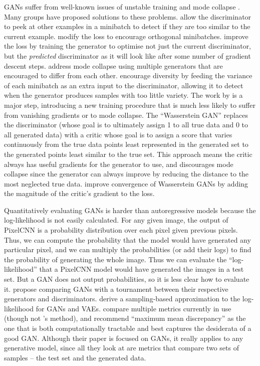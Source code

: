 \documentclass[11pt, a4paper]{book}
\newcommand{\nquote}[1]{``{#1}''}
\begin{document}
GANs suffer from well-known issues of unstable training and mode collapse \citep{gantechniques}. Many groups have proposed solutions to these problems. \citet{gantechniques} allow the discriminator to peek at other examples in a minibatch to detect if they are too similar to the current example. \citet{energygan} modify the loss to encourage orthogonal minibatches. \citet{unrolledgan} improve the loss by training the generator to optimise not just the current discriminator, but the \emph{predicted} discriminator as it will look like after some number of gradient descent steps. \citet{multiagentgan} address mode collapse using multiple generators that are encouraged to differ from each other. \citet{progressivegrowing} encourage diversity by feeding the variance of each minibatch as an extra input to the discriminator, allowing it to detect when the generator produces samples with too little variety. The work by \citet{wgan} is a major step, introducing a new training procedure that is much less likely to suffer from vanishing gradients or to mode collapse. The \nquote{Wasserstein GAN} replaces the discriminator (whose goal is to ultimately assign 1 to all true data and 0 to all generated data) with a critic whose goal is to assign a score that varies continuously from the true data points least represented in the generated set to the generated points least similar to the true set. This approach means the critic always has useful gradients for the generator to use, and discourages mode collapse since the generator can always improve by reducing the distance to the most neglected true data. \citet{improvedwgans} improve convergence of Wasserstein GANs by adding the magnitude of the critic's gradient to the loss.

Quantitatively evaluating GANs is harder than autoregressive models because the log-likelihood is not easily calculated. For any given image, the output of PixelCNN is a probability distribution over each pixel given previous pixels. Thus, we can compute the probability that the model would have generated any particular pixel, and we can multiply the probabilities (or add their logs) to find the probability of generating the whole image. Thus we can evaluate the \nquote{log-likelihood} that a PixelCNN model would have generated the images in a test set. But a GAN does not output probabilities, so it is less clear how to evaluate it. \citet{gantournament} propose comparing GANs with a tournament between their respective generators and discriminators. \citet{likelihoodestimation} derive a sampling-based approximation to the log-likelihood for GANs and VAEs. \citet{ganmetrics} compare multiple metrics currently in use (though not \citet{likelihoodestimation}'s method), and recommend \nquote{maximum mean discrepancy} \citep{mmd} as the one that is both computationally tractable and best captures the desiderata of a good GAN. Although their paper is focused on GANs, it really applies to any generative model, since all they look at are metrics that compare two sets of samples -- the test set and the generated data.
\end{document}
